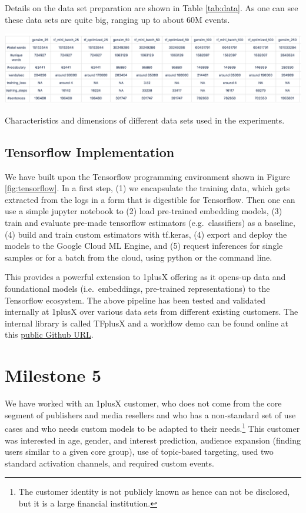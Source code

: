\documentclass{article}
\begin{document}
Details on the data set preparation are shown in Table \ref{tab:data}. As one can see these data sets are quite big, ranging up to about 60M events. 
\begin{table}
\begin{center}
\includegraphics[width=\textwidth]{data_val}
\end{center}
\caption{Characteristics and dimensions of different data sets used in the experiments.}
\label{tab:data}
\end{table}

\subsection{Tensorflow Implementation}

We have built upon the Tensorflow programming environment shown in Figure \ref{fig:tensorflow}. In a first step, (1) we encapsulate the training data, which gets extracted from the logs in a form that is digestible for Tensorflow. Then one can use a simple jupyter notebook to (2) load pre-trained embedding models,  (3) train and evaluate pre-made tensorflow estimators (e.g.~classifiers) as a baseline, (4) build and train custom estimators with tf.keras, (4) export and deploy the models to the Google Cloud ML Engine, and (5) request inferences for single samples or for a batch from the cloud, using python or the command line.

This provides a powerful extension to 1plusX offering as it opens-up data and foundational models (i.e.~embeddings, pre-trained representations) to the Tensorflow ecosystem. The above pipeline has been tested and validated internally at 1plusX over various data sets from different existing customers.  The internal library is called TFplusX and a workflow demo can be found online at this \href{https://gist.github.com/Zacharias030/a56194322259ec336954ce4452aef68f}{public Github URL}.

\section{Milestone 5}

We have worked with an 1plusX customer, who does not come from the core segment of publishers and media resellers and who has a non-standard set of use cases and who needs custom models to be adapted to their needs.\footnote{The customer identity is not publicly known as hence can not be disclosed, but it is a large financial institution.} This customer was interested in age, gender, and interest prediction, audience expansion (finding users similar to a given core group), use of topic-based targeting, used two standard activation channels, and required custom events. 
\end{document}
